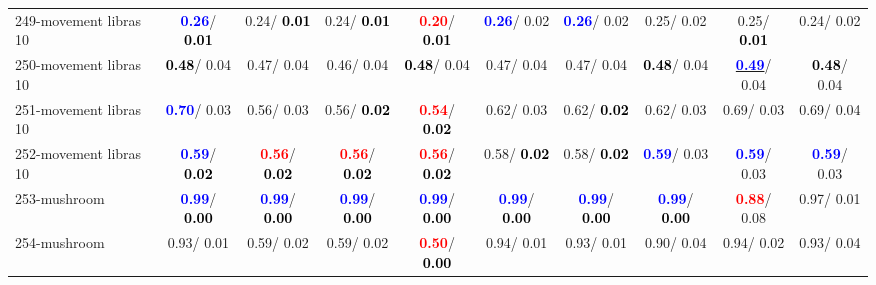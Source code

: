 \begin{table}[h]
\begin{center}
{\begin{tabular}{lc|c|c|c|c|c|c|c|c}
249-movement libras 10 & \textcolor{blue}{\textbf{  0.26}}/\textcolor{black}{\textbf{  0.01}} &   0.24/\textcolor{black}{\textbf{  0.01}} &   0.24/\textcolor{black}{\textbf{  0.01}} & \textcolor{red}{\textbf{  0.20}}/\textcolor{black}{\textbf{  0.01}} & \textcolor{blue}{\textbf{  0.26}}/  0.02 & \textcolor{blue}{\textbf{  0.26}}/  0.02 &   0.25/  0.02 &   0.25/\textcolor{black}{\textbf{  0.01}} &   0.24/  0.02 \\
250-movement libras 10 & \textcolor{black}{\textbf{  0.48}}/  0.04 &   0.47/  0.04 &   0.46/  0.04 & \textcolor{black}{\textbf{  0.48}}/  0.04 &   0.47/  0.04 &   0.47/  0.04 & \textcolor{black}{\textbf{  0.48}}/  0.04 & \underline{\textcolor{blue}{\textbf{  0.49}}}/  0.04 & \textcolor{black}{\textbf{  0.48}}/  0.04 \\
251-movement libras 10 & \textcolor{blue}{\textbf{  0.70}}/  0.03 &   0.56/  0.03 &   0.56/\textcolor{black}{\textbf{  0.02}} & \textcolor{red}{\textbf{  0.54}}/\textcolor{black}{\textbf{  0.02}} &   0.62/  0.03 &   0.62/\textcolor{black}{\textbf{  0.02}} &   0.62/  0.03 &   0.69/  0.03 &   0.69/  0.04 \\
252-movement libras 10 & \textcolor{blue}{\textbf{  0.59}}/\textcolor{black}{\textbf{  0.02}} & \textcolor{red}{\textbf{  0.56}}/\textcolor{black}{\textbf{  0.02}} & \textcolor{red}{\textbf{  0.56}}/\textcolor{black}{\textbf{  0.02}} & \textcolor{red}{\textbf{  0.56}}/\textcolor{black}{\textbf{  0.02}} &   0.58/\textcolor{black}{\textbf{  0.02}} &   0.58/\textcolor{black}{\textbf{  0.02}} & \textcolor{blue}{\textbf{  0.59}}/  0.03 & \textcolor{blue}{\textbf{  0.59}}/  0.03 & \textcolor{blue}{\textbf{  0.59}}/  0.03 \\ \hline
253-mushroom & \textcolor{blue}{\textbf{  0.99}}/\textcolor{black}{\textbf{  0.00}} & \textcolor{blue}{\textbf{  0.99}}/\textcolor{black}{\textbf{  0.00}} & \textcolor{blue}{\textbf{  0.99}}/\textcolor{black}{\textbf{  0.00}} & \textcolor{blue}{\textbf{  0.99}}/\textcolor{black}{\textbf{  0.00}} & \textcolor{blue}{\textbf{  0.99}}/\textcolor{black}{\textbf{  0.00}} & \textcolor{blue}{\textbf{  0.99}}/\textcolor{black}{\textbf{  0.00}} & \textcolor{blue}{\textbf{  0.99}}/\textcolor{black}{\textbf{  0.00}} & \textcolor{red}{\textbf{  0.88}}/  0.08 &   0.97/  0.01 \\
254-mushroom &   0.93/  0.01 &   0.59/  0.02 &   0.59/  0.02 & \textcolor{red}{\textbf{  0.50}}/\textcolor{black}{\textbf{  0.00}} &   0.94/  0.01 &   0.93/  0.01 &   0.90/  0.04 &   0.94/  0.02 &   0.93/  0.04 \\

\end{tabular}}
\end{center}
\end{table}

